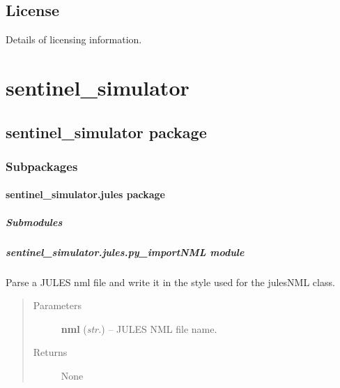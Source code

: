 \documentclass[letterpaper,10pt,english]{sphinxmanual}
\begin{document}
\subsection{License}
\label{source/README:license}
Details of licensing information.


\section{sentinel\_simulator}
\label{source/modules::doc}\label{source/modules:sentinel-simulator}

\subsection{sentinel\_simulator package}
\label{source/sentinel_simulator:sentinel-simulator-package}\label{source/sentinel_simulator::doc}

\subsubsection{Subpackages}
\label{source/sentinel_simulator:subpackages}

\paragraph{sentinel\_simulator.jules package}
\label{source/sentinel_simulator.jules:sentinel-simulator-jules-package}\label{source/sentinel_simulator.jules::doc}

\subparagraph{Submodules}
\label{source/sentinel_simulator.jules:submodules}

\subparagraph{sentinel\_simulator.jules.py\_importNML module}
\label{source/sentinel_simulator.jules:module-sentinel_simulator.jules.py_importNML}\label{source/sentinel_simulator.jules:sentinel-simulator-jules-py-importnml-module}

\begin{fulllineitems}
\label{source/sentinel_simulator.jules:sentinel_simulator.jules.py_importNML.importJulesNML}
Parse a JULES nml file and write it in the style used for the
julesNML class.
\begin{quote}\begin{description}
\item[{Parameters}] \leavevmode
\textbf{nml} (\emph{str.}) -- JULES NML file name.

\item[{Returns}] \leavevmode
None

\end{description}\end{quote}

\end{fulllineitems}
\end{document}
